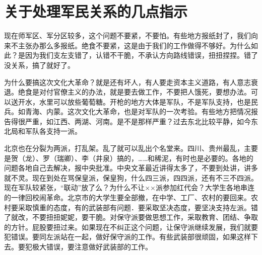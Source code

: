 \section[关于处理军民关系的几点指示（一九六七年五月）]{关于处理军民关系的几点指示}


现在师军区、军分区较多，这个问题不要紧，不要怕。有些地方报纸封了，我们向来不主张办那么多报纸。绝食不要紧，这是由于我们的工作做得不够好。为什么如此？是因为我们支左支错了，认错不干脆，不承认方向路线错误，扭扭捏捏。错了没关系，搞了就好了。

为什么要搞这次文化大革命？就是还有坏人，有人要走资本主义道路，有人意志衰退。绝食是对付官僚主义的办法，就是要去做工作，不要把人饿死，要想办法。可以送开水，水里可以放些葡萄糖。开枪的地方大体是军队，不是军队支持，也是民兵。如青海、内蒙。这次文化大革命，也是对军队的一次考验。有些地方把情况报告得很严重，如江西、两湖、河南。是不是那样严重？过去东北比较平静，如今东北局和军队各支持一派。

北京也在分裂为两派，打乱架。乱了就可以乱出个名堂来。四川、贵州最乱，主要是贺（龙）、罗（瑞卿）、李（井泉）搞的，……和稀泥，有时也是必要的。各地的问题各地自己去解决，报中央批准。中央文革最近讲得太多了，不要到处讲，讲多就不灵。现在到处在骂保皇派，保皇狗，什么四三派，四四派，还有不三不四派。现在军队较紧张，“联动”放了么？为什么不让××派参加红代会？大学生各地串连的一律回校闹革命。北京市的大学生要全部撤，在中学、工厂、农村的要回来。农村要采取慎重的态度，有的武装部有问题．要采取坚决态度，要坚决支持左派。错了就改，不要扭扭妮妮，要干脆。对保守派要做思想工作，采取教育、团结、争取的方针。屁股要扭过来。如果现在不纠正这个问题，让保守派继续发展，我们就要犯错误。要同左派站在一起，做好保守派的工作。有些武装部很顽固，如果这样下去。要犯极大错误，要注意做好武装部的工作。


